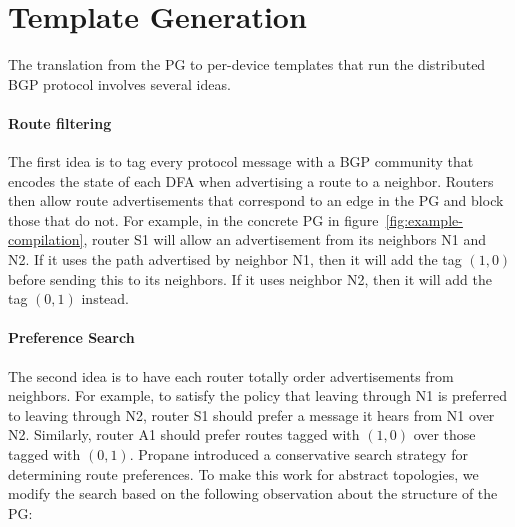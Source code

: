 \documentclass[numbers, 10pt, preprint]{sigplanconf}
\newcommand{\para}[1]{\paragraph*{\textbf{#1}}}
\newcommand{\KW}[1]{\texttt{\small\bfseries{#1}}}
\begin{document}
%
%
%
%

\newcommand{\highlight}[1]{%
  \colorbox{red!50}{$\displaystyle#1$}}
\newcommand{\Router}[1]{\KW{Router} #1:}
\newcommand{\Template}[1]{\KW{Template} #1:}
\newcommand{\REGEX}[1]{\texttt{regex}(#1)}
\newcommand{\PEER}{\texttt{peer}}
\newcommand{\PREFIX}{\texttt{prefix}}
\newcommand{\IF}{\texttt{if}}
\newcommand{\THEN}{\texttt{then}}
\newcommand{\COMM}{\texttt{comm}}
\newcommand{\MED}{\texttt{MED}}
\newcommand{\Arrow}{\ensuremath{\leftarrow}}

\section{Template Generation}
\label{sec:generation}

The translation from the PG to per-device templates that run the distributed BGP protocol involves several ideas.

\para{Route filtering}

The first idea is to tag every protocol message with a BGP community that encodes the state of each DFA when advertising a route to a neighbor. Routers then allow route advertisements that correspond to an edge in the PG and block those that do not.
For example, in the concrete PG in figure~\ref{fig:example-compilation}, router S1 will allow an advertisement from its neighbors N1 and N2. If it uses the path advertised by neighbor N1, then it will add the tag $(1,0)$ before sending this to its neighbors. If it uses neighbor N2, then it will add the tag $(0,1)$ instead.


\para{Preference Search}
The second idea is to have each router totally order advertisements from neighbors. For example, to satisfy the policy that leaving through N1 is preferred to leaving through N2, router S1 should prefer a message it hears from N1 over N2. Similarly, router A1 should prefer routes tagged with $(1,0)$ over those tagged with $(0,1)$.
Propane introduced a conservative search strategy for determining route preferences. To make this work for abstract topologies, we modify the search based on the following observation about the structure of the PG:
\end{document}
